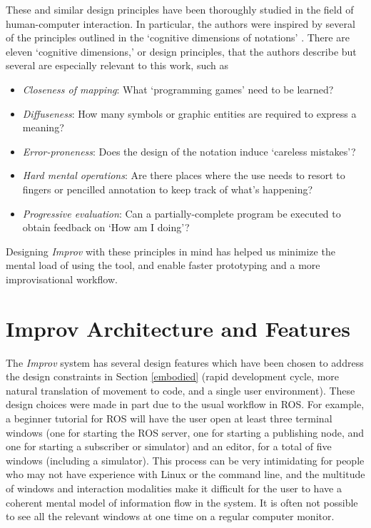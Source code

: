 \documentclass[sigconf]{acmart}
\begin{document}
These and similar design principles have been thoroughly studied in the field
of human-computer interaction. In particular, the authors were inspired by several of the principles
outlined in the `cognitive dimensions of notations' \cite{green1996usability}.
There are eleven `cognitive dimensions,' or design principles, that the authors
describe but several are especially relevant to this work, such as

\begin{itemize}
\item \emph{Closeness of mapping}: What `programming games' need to be learned?
\item \emph{Diffuseness}: How many symbols or graphic entities are required to express a meaning?
\item \emph{Error-proneness}: Does the design of the notation induce `careless mistakes'?
\item \emph{Hard mental operations}: Are there places where the use needs to resort to  fingers or pencilled annotation to keep track of what's happening?
\item \emph{Progressive evaluation}: Can a partially-complete program be executed to
obtain feedback on `How am I doing'?
\end{itemize}

Designing \emph{Improv} with these principles in mind has helped us minimize the mental
load of using the tool, and enable faster prototyping and a more
improvisational workflow.

\section{Improv Architecture and Features}\label{architecture-overview}

The \emph{Improv} system has several design features which have been chosen to
address the design constraints in Section \ref{embodied} (rapid development
cycle, more natural translation of movement to code, and a single user environment).
These design choices were made in part due to the usual workflow in ROS. For
example, a beginner tutorial for ROS will have the user open at least three
terminal windows (one for starting the ROS server, one for starting a
publishing node, and one for starting a subscriber or simulator) and an editor,
for a total of five windows (including a simulator). This process can be very
intimidating for people who may not have experience with Linux or the command
line, and the multitude of windows and interaction modalities make it difficult
for the user to have a coherent mental model of information flow in the system.
It is often not possible to see all the relevant windows at one time on a
regular computer monitor.
\end{document}
